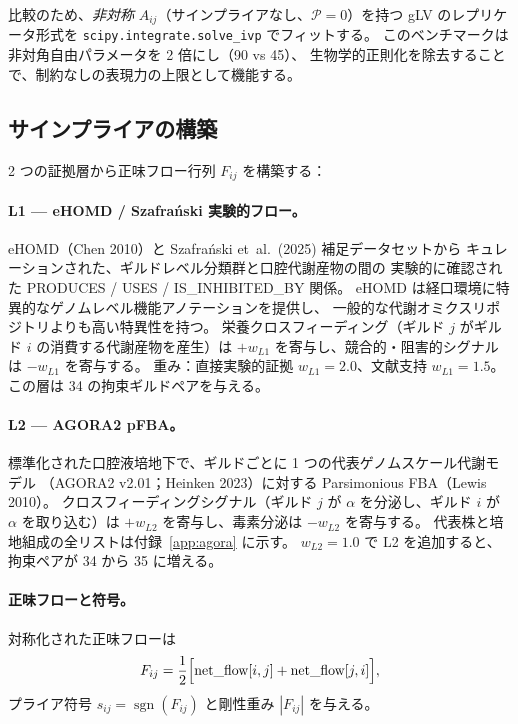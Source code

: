 \documentclass[11pt,a4paper]{article}
\newcommand{\sgn}{\operatorname{sgn}}
\newcommand{\calP}{\mathcal{P}}
\begin{document}
比較のため、\emph{非対称} $A_{ij}$（サインプライアなし、$\calP=0$）を持つ
gLV のレプリケータ形式を \texttt{scipy.integrate.solve\_ivp} でフィットする。
このベンチマークは非対角自由パラメータを 2 倍にし（90 vs 45）、
生物学的正則化を除去することで、制約なしの表現力の上限として機能する。

\subsection{サインプライアの構築}
\label{ssec:prior}

2 つの証拠層から正味フロー行列 $F_{ij}$ を構築する：

\paragraph{L1 --- eHOMD / Szafra\'{n}ski 実験的フロー。}
eHOMD（Chen 2010）と Szafra\'{n}ski et~al.~(2025) 補足データセットから
キュレーションされた、ギルドレベル分類群と口腔代謝産物の間の
実験的に確認された PRODUCES / USES / IS\_INHIBITED\_BY 関係。
eHOMD は経口環境に特異的なゲノムレベル機能アノテーションを提供し、
一般的な代謝オミクスリポジトリよりも高い特異性を持つ。
栄養クロスフィーディング（ギルド $j$ がギルド $i$ の消費する代謝産物を産生）は
$+w_{L1}$ を寄与し、競合的・阻害的シグナルは $-w_{L1}$ を寄与する。
重み：直接実験的証拠 $w_{L1}=2.0$、文献支持 $w_{L1}=1.5$。
この層は 34 の拘束ギルドペアを与える。

\paragraph{L2 --- AGORA2 pFBA。}
標準化された口腔液培地下で、ギルドごとに 1 つの代表ゲノムスケール代謝モデル
（AGORA2 v2.01；Heinken 2023）に対する Parsimonious FBA（Lewis 2010）。
クロスフィーディングシグナル（ギルド $j$ が $\alpha$ を分泌し、ギルド $i$ が $\alpha$ を取り込む）は
$+w_{L2}$ を寄与し、毒素分泌は $-w_{L2}$ を寄与する。
代表株と培地組成の全リストは付録~\ref{app:agora} に示す。
$w_{L2}=1.0$ で L2 を追加すると、拘束ペアが 34 から 35 に増える。

\paragraph{正味フローと符号。}
対称化された正味フローは
\begin{equation}
  F_{ij} = \frac{1}{2}
    \Bigl[\text{net\_flow}[i,j] + \text{net\_flow}[j,i]\Bigr],
  \label{eq:flow}
\end{equation}
プライア符号 $s_{ij}=\sgn(F_{ij})$ と剛性重み $|F_{ij}|$ を与える。
\end{document}
